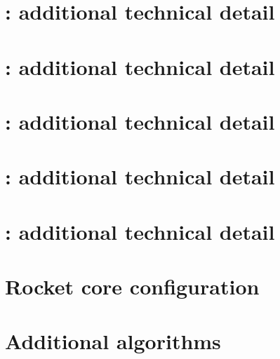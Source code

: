 \documentclass[preprint]{iacrtrans}
\begin{document}

\appendix

\newpage
\section{: additional technical detail}
\label{sec:pseudo:v1}

\newpage
\section{: additional technical detail}
\label{sec:pseudo:v2}

\newpage
\section{: additional technical detail}
\label{sec:pseudo:v3}

\newpage
\section{: additional technical detail}
\label{sec:pseudo:v4}

\newpage
\section{: additional technical detail}
\label{sec:pseudo:v5}


\newpage
\section{Rocket core configuration}
\label{sec:rocket:cfg}


\newpage
\section{Additional algorithms}
\label{sec:alg}


\end{document}

